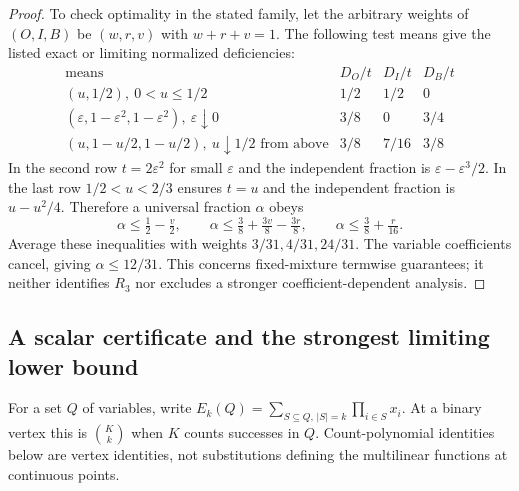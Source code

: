 \begin{proof}
To check optimality in the stated family, let the arbitrary weights of
$(O,I,B)$ be $(w,r,v)$ with $w+r+v=1$. The following test means give the
listed exact or limiting normalized deficiencies:
\[
\begin{array}{c|ccc}
\text{means}&D_O/t&D_I/t&D_B/t\\\hline
(u,1/2),\ 0<u\le1/2&1/2&1/2&0\\
(\varepsilon,1-\varepsilon^2,1-\varepsilon^2),\ \varepsilon\downarrow0
 &3/8&0&3/4\\
(u,1-u/2,1-u/2),\ u\downarrow1/2\text{ from above}&3/8&7/16&3/8
\end{array}
\]
In the second row $t=2\varepsilon^2$ for small $\varepsilon$ and the
independent fraction is $\varepsilon-\varepsilon^3/2$. In the last row
$1/2<u<2/3$ ensures $t=u$ and the independent fraction is $u-u^2/4$.
Therefore a universal fraction $\alpha$ obeys
\[
 \alpha\le\tfrac12-\tfrac v2,\qquad
 \alpha\le\tfrac38+\tfrac{3v}8-\tfrac{3r}8,\qquad
 \alpha\le\tfrac38+\tfrac r{16}.
\]
Average these inequalities with weights $3/31,4/31,24/31$. The variable
coefficients cancel, giving $\alpha\le12/31$.
This concerns fixed-mixture termwise guarantees; it neither identifies
$R_3$ nor excludes a stronger coefficient-dependent analysis.
\end{proof}

\subsection{A scalar certificate and the strongest limiting lower bound}
For a set $Q$ of variables, write
$E_k(Q)=\sum_{S\subseteq Q,\,|S|=k}\prod_{i\in S}x_i$.
At a binary vertex this is $\binom{K}{k}$ when $K$ counts successes in
$Q$. Count-polynomial identities below are vertex identities, not
substitutions defining the multilinear functions at continuous points.

